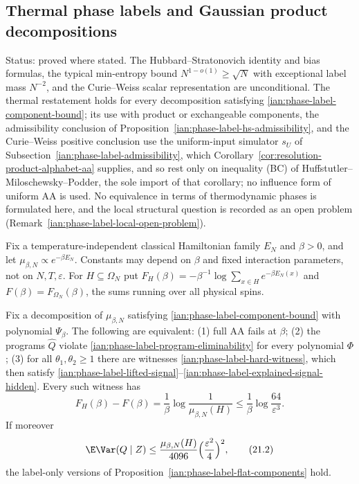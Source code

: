 \subsection{Thermal phase labels and Gaussian product decompositions}
\label{ian:phase-label-gibbs}

Status: proved where stated. The Hubbard--Stratonovich identity and bias formulas, the typical min-entropy bound \(N^{1-o(1)}\ge\sqrt N\) with exceptional label mass \(N^{-2}\), and the Curie--Weiss scalar representation are unconditional. The thermal restatement holds for every decomposition satisfying \eqref{ian:phase-label-component-bound}; its use with product or exchangeable components, the admissibility conclusion of Proposition~\ref{ian:phase-label-hs-admissibility}, and the Curie--Weiss positive conclusion use the uniform-input simulator \(s_U\) of Subsection~\ref{ian:phase-label-admissibility}, which Corollary~\ref{cor:resolution-product-alphabet-aa} supplies, and so rest only on inequality (BC) of Huffstutler--Miloschewsky--Podder, the sole import of that corollary; no influence form of uniform AA is used. No equivalence in terms of thermodynamic phases is formulated here, and the local structural question is recorded as an open problem (Remark~\ref{ian:phase-label-local-open-problem}).

Fix a temperature-independent classical Hamiltonian family \(E_N\) and
\(\beta>0\), and let \(\mu_{\beta,N}\propto e^{-\beta E_N}\). Constants may
depend on \(\beta\) and fixed interaction parameters, not on
\(N,T,\varepsilon\). For \(H\subseteq\Omega_N\) put
\(F_H(\beta)=-\beta^{-1}\log\sum_{x\in H}e^{-\beta E_N(x)}\) and
\(F(\beta)=F_{\Omega_N}(\beta)\), the sums running over all physical
spins.

\begin{theorem}
\label{ian:phase-label-thermal-theorem}
Fix a decomposition of \(\mu_{\beta,N}\) satisfying
\eqref{ian:phase-label-component-bound} with polynomial \(\Psi_\beta\).
The following are equivalent:
(1) full AA fails at \(\beta\);
(2) the programs \(\widehat Q\) violate
\eqref{ian:phase-label-program-eliminability} for every polynomial \(\Phi\);
(3) for all \(\theta_1,\theta_2\ge1\) there are witnesses
\eqref{ian:phase-label-hard-witness}, which then satisfy
\eqref{ian:phase-label-lifted-signal}--\eqref{ian:phase-label-explained-signal-hidden}.
Every such witness has
\[
 F_H(\beta)-F(\beta)
 =\frac1\beta\log\frac1{\mu_{\beta,N}(H)}
 \le\frac1\beta\log\frac{64}{\varepsilon^3}.
 \tag{21.1}\label{ian:phase-label-thermal-gap}
\]
If moreover
\[
 \E\Var(Q\mid Z)\le\frac{\mu_{\beta,N}(H)}{4096}\Bigl(\frac{\varepsilon^2}{4}\Bigr)^2,
 \tag{21.2}\label{ian:phase-label-thermal-flatness}
\]
the label-only versions of Proposition~\ref{ian:phase-label-flat-components} hold.
\end{theorem}

